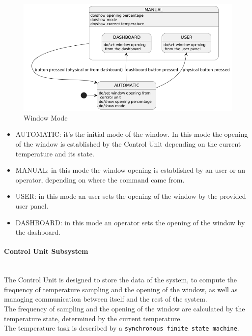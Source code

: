 \documentclass[a4paper,12pt]{report}
\begin{document}
            \begin{figure}[H]
                \centering{}
                \includegraphics[width=\textwidth]{uml/img/WindowModeUML.png}
                \caption{Window Mode}
                \label{img:window_mode}
            \end{figure}

            \begin{itemize}
                \item AUTOMATIC: it's the initial mode of the window. In this mode the opening of the window is established by the 
                Control Unit depending on the current temperature and its state. 
                \item MANUAL: in this mode the window opening is established by an user or an operator, depending on where the command 
                came from.
                \item USER: in this mode an user sets the opening of the window by the provided user panel.
                \item DASHBOARD: in this mode an operator sets the opening of the window by the dashboard.
            \end{itemize}

        \newpage
        \paragraph{Control Unit Subsystem\\}
            \ \\
            The Control Unit is designed to store the data of the system, to compute the frequency of temperature sampling and the opening 
            of the window, as well as managing communication between itself and the rest of the system.\\
            The frequency of sampling and the opening of the window are calculated by the temperature state, determined by the current 
            temperature.\\
            The temperature task is described by a \texttt{synchronous finite state machine}. 
\end{document}
